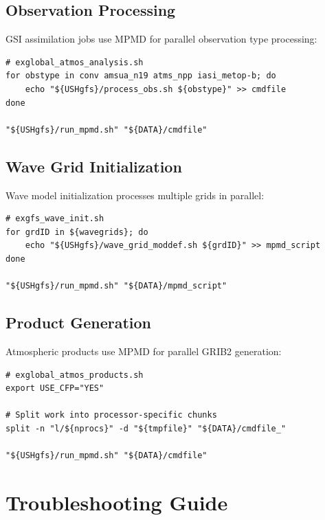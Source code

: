 \documentclass[11pt,a4paper,twoside]{article}
\begin{document}
\subsection{Observation Processing}

GSI assimilation jobs use MPMD for parallel observation type processing:

\begin{lstlisting}[style=bashstyle,caption={GSI Observation Processing MPMD},label={lst:gsi}]
# exglobal_atmos_analysis.sh
for obstype in conv amsua_n19 atms_npp iasi_metop-b; do
    echo "${USHgfs}/process_obs.sh ${obstype}" >> cmdfile
done

"${USHgfs}/run_mpmd.sh" "${DATA}/cmdfile"
\end{lstlisting}

\subsection{Wave Grid Initialization}

Wave model initialization processes multiple grids in parallel:

\begin{lstlisting}[style=bashstyle,caption={Wave Grid MPMD},label={lst:wave}]
# exgfs_wave_init.sh
for grdID in ${wavegrids}; do
    echo "${USHgfs}/wave_grid_moddef.sh ${grdID}" >> mpmd_script
done

"${USHgfs}/run_mpmd.sh" "${DATA}/mpmd_script"
\end{lstlisting}

\subsection{Product Generation}

Atmospheric products use MPMD for parallel GRIB2 generation:

\begin{lstlisting}[style=bashstyle,caption={Product Generation MPMD},label={lst:prod}]
# exglobal_atmos_products.sh
export USE_CFP="YES"

# Split work into processor-specific chunks
split -n "l/${nprocs}" -d "${tmpfile}" "${DATA}/cmdfile_"

"${USHgfs}/run_mpmd.sh" "${DATA}/cmdfile"
\end{lstlisting}

\section{Troubleshooting Guide}
\label{sec:troubleshooting}
\end{document}
